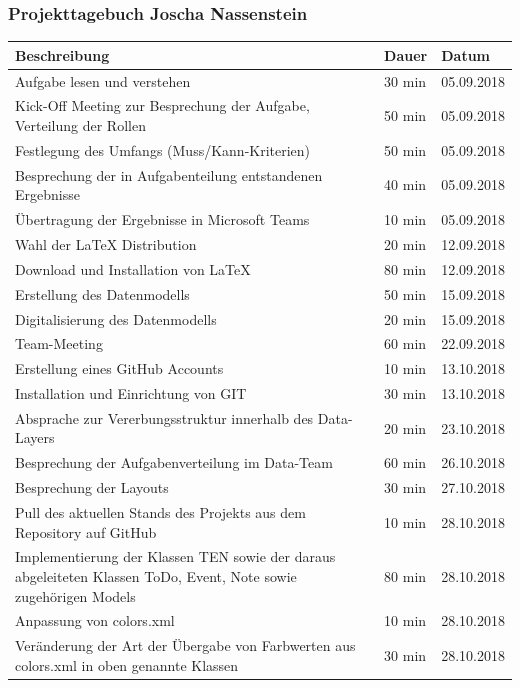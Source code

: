 \newpage
\subsubsection{Projekttagebuch Joscha Nassenstein}
\begin{longtable}{|p{10cm}|p{2cm}|p{2cm}|}
\hline
{\textbf{Beschreibung}} & {\textbf{Dauer}} & {\textbf{Datum}} \\ \hline
Aufgabe lesen und verstehen & 30 min & 05.09.2018 \\ \hline
Kick-Off Meeting zur Besprechung der Aufgabe, Verteilung der Rollen & 50 min & 05.09.2018 \\ \hline
Festlegung des Umfangs (Muss/Kann-Kriterien) & 50 min & 05.09.2018 \\ \hline
Besprechung der in Aufgabenteilung entstandenen Ergebnisse & 40 min & 05.09.2018 \\ \hline
Übertragung der Ergebnisse in Microsoft Teams & 10 min & 05.09.2018 \\ \hline
Wahl der LaTeX Distribution & 20 min & 12.09.2018 \\ \hline
Download und Installation von LaTeX & 80 min & 12.09.2018 \\ \hline
Erstellung des Datenmodells & 50 min & 15.09.2018 \\ \hline
Digitalisierung des Datenmodells & 20 min & 15.09.2018 \\ \hline
Team-Meeting & 60 min & 22.09.2018 \\ \hline
Erstellung eines GitHub Accounts & 10 min & 13.10.2018 \\ \hline
Installation und Einrichtung von GIT & 30 min & 13.10.2018 \\ \hline
Absprache zur Vererbungsstruktur innerhalb des Data-Layers  & 20 min & 23.10.2018 \\ \hline
Besprechung der Aufgabenverteilung im Data-Team & 60 min & 26.10.2018 \\ \hline
Besprechung der Layouts & 30 min & 27.10.2018 \\ \hline
Pull des aktuellen Stands des Projekts aus dem Repository auf GitHub & 10 min & 28.10.2018 \\ \hline
Implementierung der Klassen TEN sowie der daraus abgeleiteten Klassen ToDo, Event, Note sowie zugehörigen Models & 80 min & 28.10.2018 \\ \hline
Anpassung von colors.xml  & 10 min & 28.10.2018 \\ \hline
Veränderung der Art der Übergabe von Farbwerten aus colors.xml in oben genannte Klassen & 30 min & 28.10.2018 \\ \hline

\end{longtable}
